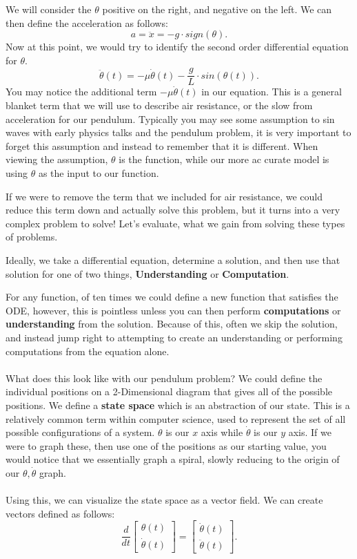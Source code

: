 \documentclass[10pt, oneside]{report}
\begin{document}
We will consider the $\theta$ positive on the right, and negative on the left.  We can then define the acceleration as follows:
\[
    a = \ddot{x} = -g \cdot sign(\theta)
.\] 
Now at this point, we would try to identify the second order differential equation for $\theta$. 
\[
    \ddot{\theta}(t) = -\mu\dot{\theta}(t) - \frac{g}{L} \cdot sin(\theta(t))
.\] 
You may notice the additional term $-\mu\dot{\theta}(t)$ in our equation.  This is a general blanket term that we will use to describe air resistance, or the slow from acceleration for our pendulum.  Typically you may see some assumption to sin waves with early physics talks and the pendulum problem, it is very important to forget this assumption and instead to remember that it is different.  When viewing the assumption, $\theta$ is the function, while our more ac curate model is using $\theta$ as the input to our function.  

If we were to remove the term that we included for air resistance, we could reduce this term down and actually solve this problem, but it turns into a very complex problem to solve! Let's evaluate, what we gain from solving these types of problems.

Ideally, we take a differential equation, determine a solution, and then use that solution for one of two things, \textbf{Understanding} or \textbf{Computation}.

For any function, of ten times we could define a new function that satisfies the ODE, however, this is pointless unless you can then perform \textbf{computations} or \textbf{understanding} from the solution.  Because of this, often we skip the solution, and instead jump right to attempting to create an understanding or performing computations from the equation alone.  
\\
\\
What does this look like with our pendulum problem? We could define the individual positions on a 2-Dimensional diagram that gives all of the possible positions.  We define a \textbf{state space} which is an abstraction of our state.  This is a relatively common term within computer science, used to represent the set of all possible configurations of a system.  $\theta$ is our $x$ axis while $\dot{\theta}$ is our $y$ axis.  If we were to graph these, then use one of the positions as our starting value, you would notice that we essentially graph a spiral, slowly reducing to the origin of our $\theta, \dot{\theta}$ graph.  
\\
\\
Using this, we can visualize the state space as a vector field.  We can create vectors defined as follows:
\[
\frac{d}{dt} \begin{bmatrix}
    \theta(t) \\
    \dot{\theta}(t)
\end{bmatrix} = 
\begin{bmatrix}
    \dot{\theta}(t)\\
    \ddot{\theta}(t)
    
\end{bmatrix}
.\] 
\end{document}
